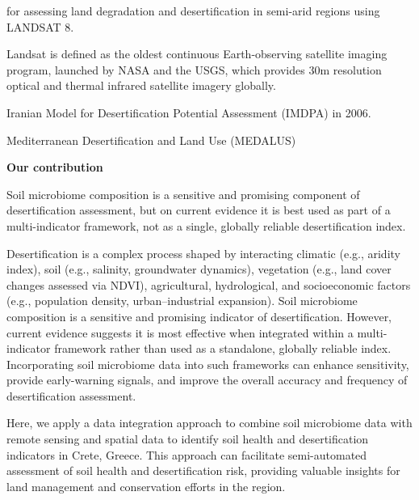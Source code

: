 \documentclass[a4paper,12pt]{article}
\begin{document}
for assessing land degradation and desertification in semi-arid regions using LANDSAT 8. 

Landsat is defined as the oldest continuous Earth-observing satellite imaging program, launched by NASA and the USGS, which provides 30m 
resolution optical and thermal infrared satellite imagery globally.

Iranian Model for Desertification Potential Assessment (IMDPA) in 2006.

Mediterranean Desertification and Land Use (MEDALUS)




\bigbreak

\textbf{Our contribution}

Soil microbiome composition is a sensitive and promising component of desertification assessment, 
but on current evidence it is best used as part of a multi-indicator framework, not as a single, globally reliable desertification index.


Desertification is a complex process shaped by interacting climatic (e.g., aridity index), 
soil (e.g., salinity, groundwater dynamics), vegetation (e.g., land cover changes assessed via NDVI), 
agricultural, hydrological, and socioeconomic factors (e.g., population density, urban–industrial expansion).
Soil microbiome composition is a sensitive and promising indicator of desertification. 
However, current evidence suggests it is most effective when integrated within a multi-indicator framework rather than used as a standalone, 
globally reliable index. 
Incorporating soil microbiome data into such frameworks can enhance sensitivity, provide early-warning signals, 
and improve the overall accuracy and frequency of desertification assessment.

Here, we apply a data integration approach to combine soil microbiome data with remote sensing and spatial data to 
identify soil health and desertification indicators in Crete, Greece.
This approach can facilitate semi-automated assessment of soil health and desertification risk, 
providing valuable insights for land management and conservation efforts in the region.
\end{document}
